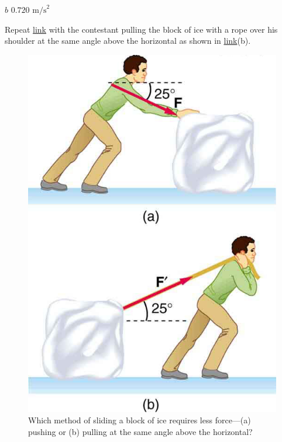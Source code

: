 \documentclass[
]{book}
\newenvironment{problems-exercises}{}{}
\begin{document}
\begin{problems-exercises}
\(b\) \({0\text{.}\text{720\ m}\text{/s}^{2}}{}\)

\hypertarget{fs-id1529666}{}
\leavevmode\hypertarget{fs-id1529667}{}%
Repeat \protect\hyperlink{fs-id1531145}{link} with the contestant
pulling the block of ice with a rope over his shoulder at the same angle
above the horizontal as shown in
\protect\hyperlink{import-auto-id1165298619770}{link}(b).

\begin{figure}
\hypertarget{import-auto-id1165298619770}{%
\centering
\includegraphics{images/Figure_06_01_07a.jpg}
\caption{Which method of sliding a block of ice requires less force---(a)
pushing or (b) pulling at the same angle above the
horizontal?}\label{import-auto-id1165298619770}
}
\end{figure}

\end{problems-exercises}
\end{document}
